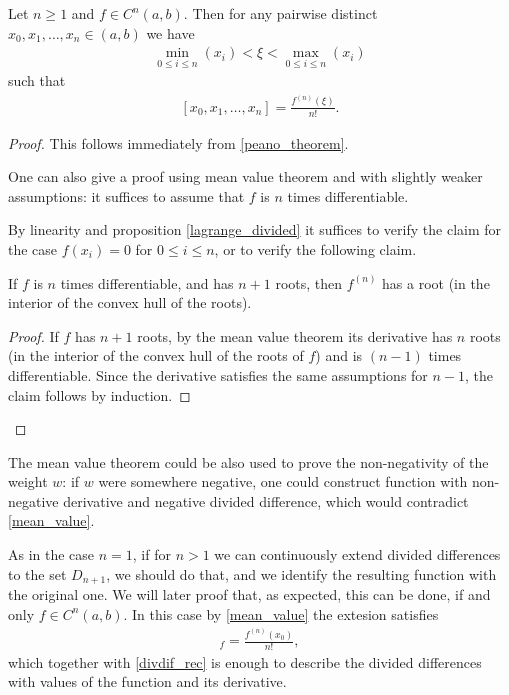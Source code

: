 \begin{lause}
	Let $n \geq 1$ and $f \in C^{n}(a, b)$. Then for any pairwise distinct $x_{0}, x_{1}, \ldots, x_{n} \in (a, b)$ we have
	\begin{align*}
	\min_{0 \leq i \leq n}(x_{i}) < \xi < \max_{0 \leq i \leq n}(x_{i})
	\end{align*}
	such that
	\begin{align}\label{mean_value}
		[x_{0}, x_{1}, \ldots, x_{n}] = \frac{f^{(n)}(\xi)}{n!}.
	\end{align}
\end{lause}
\begin{proof}
	This follows immediately from \ref{peano_theorem}.

	One can also give a proof using mean value theorem and with slightly weaker assumptions: it suffices to assume that $f$ is $n$ times differentiable.

	By linearity and proposition \ref{lagrange_divided} it suffices to verify the claim for the case $f(x_{i}) = 0$ for $0 \leq i \leq n$, or to verify the following claim.

	\begin{lem}
		If $f$ is $n$ times differentiable, and has $n + 1$ roots, then $f^{(n)}$ has a root (in the interior of the convex hull of the roots).
	\end{lem}
	\begin{proof}
		If $f$ has $n + 1$ roots, by the mean value theorem its derivative has $n$ roots (in the interior of the convex hull of the roots of $f$) and is $(n - 1)$ times differentiable. Since the derivative satisfies the same assumptions for $n - 1$, the claim follows by induction.
	\end{proof}
\end{proof}

The mean value theorem could be also used to prove the non-negativity of the weight $w$: if $w$ were somewhere negative, one could construct function with non-negative derivative and negative divided difference, which would contradict \ref{mean_value}.

As in the case $n = 1$, if for $n > 1$ we can continuously extend divided differences to the set $D_{n + 1}$, we should do that, and we identify the resulting function with the original one. We will later proof that, as expected, this can be done, if and only $f \in C^{n}(a, b)$. In this case by \ref{mean_value} the extesion satisfies
\begin{align*}
	[x_{0}, x_{0}, \ldots, x_{0}]_{f} = \frac{f^{(n)}(x_{0})}{n!},
\end{align*}
which together with \ref{divdif_rec} is enough to describe the divided differences with values of the function and its derivative.

